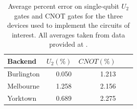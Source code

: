 \begin{table} \centering
  \begin{tabular}{lrrrr}
    \toprule
    Backend & $U_2 (\%)$ & $CNOT (\%)$ \\
    \midrule
    Burlington & 0.050 & 1.213 \\
    Melbourne & 1.258 & 2.156 \\
    Yorktown & 0.689 & 2.275 \\
    \bottomrule
  \end{tabular}
  \caption{Average percent error on single-qubit $U_2$ gates and CNOT gates for the
    three devices used to implement the circuits of interest. All averages taken
    from data provided at \cite{ibmq_burlington,ibmq_16_melbourne,ibmq_yorktown}.}
  \label{tb:average_errors}
\end{table}

